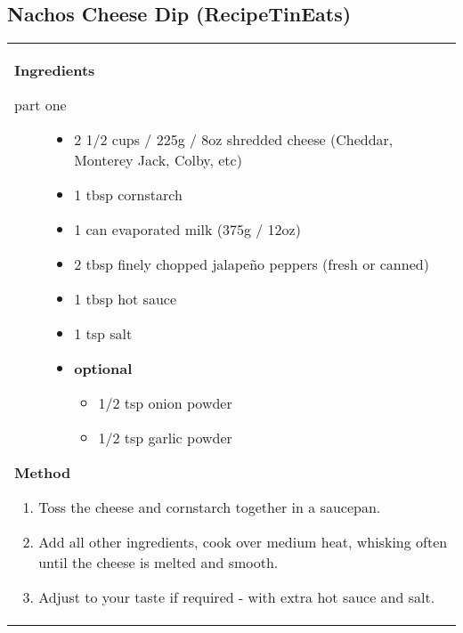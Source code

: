 \documentclass[web-recipes.tex]{subfiles}
\begin{document}
\renewcommand{\mytitle}{Nachos Cheese Dip (RecipeTinEats)}
\renewcommand{\myurl}{https://www.recipetineats.com/nachos-cheese-dip-sauce/}
\begin{mdframed}[nobreak]
  \section{\mytitle}
  \begin{tabular}{l}
    \begin{minipage}[t]{0.35\textwidth}
      {\sffamily\bfseries Ingredients}\vspace{0.5ex}
      \begin{description}
        \item[part one] \hfill
          \begin{itemize}
            \item 2 1/2 cups / 225g / 8oz shredded cheese (Cheddar, Monterey Jack, Colby, etc)
            \item 1 tbsp cornstarch
            \item 1 can evaporated milk (375g / 12oz)
            \item 2 tbsp finely chopped jalapeño peppers (fresh or canned)
            \item 1 tbsp hot sauce
            \item 1 tsp salt
            \item \textbf{optional}
              \begin{itemize}
                \item 1/2 tsp onion powder
                \item 1/2 tsp garlic powder
              \end{itemize}
          \end{itemize}
      \end{description}
    \end{minipage}
    \qquad
    \begin{minipage}[t]{0.55\textwidth}
      {\sffamily\bfseries Method}\vspace{0.5ex}
      \begin{enumerate}\raggedright\small\sffamily
        \item Toss the cheese and cornstarch together in a saucepan.
        \item Add all other ingredients, cook over medium heat, whisking often
          until the cheese is melted and smooth.
        \item Adjust to your taste if required - with extra hot sauce and salt.

\end{enumerate}
\end{minipage}
\end{tabular}
\end{mdframed}
\end{document}
